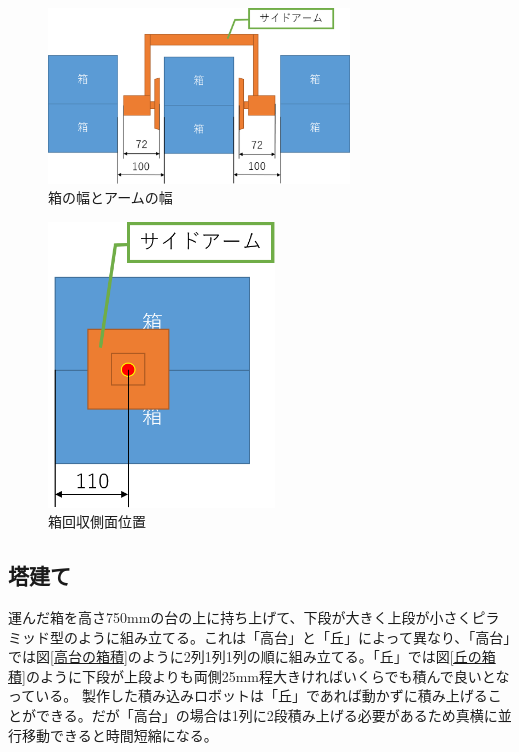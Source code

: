 \documentclass[12pt,oneside]{sotsuken_paper}
\begin{document}
		\begin{figure}[htp]
			\begin{center}
				\includegraphics[width=80mm]{Image/箱回収位置寸法.png}
				\caption{箱の幅とアームの幅}
				\label{箱回収位置寸法}
			\end{center}
		\end{figure}

		\begin{figure}[htp]
			\begin{center}
				\includegraphics[width=60mm]{Image/箱回収（側面）.png}
				\caption{箱回収側面位置}
				\label{箱回収側面位置}
			\end{center}
		\end{figure}

		\subsection{塔建て}
		運んだ箱を高さ750mmの台の上に持ち上げて、下段が大きく上段が小さくピラミッド型のように組み立てる。これは「高台」と「丘」によって異なり、「高台」では図\ref{高台の箱積}のように2列1列1列の順に組み立てる。「丘」では図\ref{丘の箱積}のように下段が上段よりも両側25mm程大きければいくらでも積んで良いとなっている。
		製作した積み込みロボットは「丘」であれば動かずに積み上げることができる。だが「高台」の場合は1列に2段積み上げる必要があるため真横に並行移動できると時間短縮になる。
\end{document}
